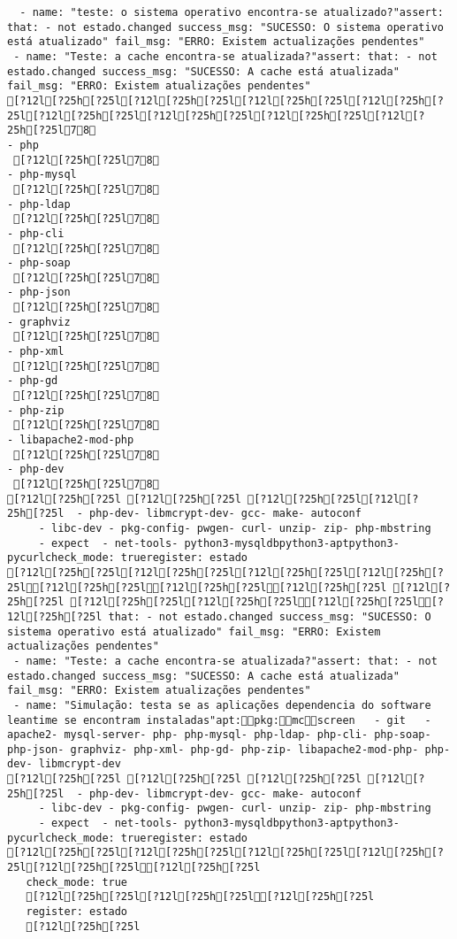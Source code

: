 \documentclass{scrartcl}
\begin{document}
\begin{Verbatim}
  - name: "teste: o sistema operativo encontra-se atualizado?"assert: that: - not estado.changed success_msg: "SUCESSO: O sistema operativo está atualizado" fail_msg: "ERRO: Existem actualizações pendentes"
 - name: "Teste: a cache encontra-se atualizada?"assert: that: - not estado.changed success_msg: "SUCESSO: A cache está atualizada" fail_msg: "ERRO: Existem atualizações pendentes"
[?12l[?25h[?25l[?12l[?25h[?25l[?12l[?25h[?25l[?12l[?25h[?25l[?12l[?25h[?25l[?12l[?25h[?25l[?12l[?25h[?25l[?12l[?25h[?25l78
- php
 [?12l[?25h[?25l78
- php-mysql
 [?12l[?25h[?25l78
- php-ldap
 [?12l[?25h[?25l78
- php-cli
 [?12l[?25h[?25l78
- php-soap
 [?12l[?25h[?25l78
- php-json
 [?12l[?25h[?25l78
- graphviz
 [?12l[?25h[?25l78
- php-xml
 [?12l[?25h[?25l78
- php-gd
 [?12l[?25h[?25l78
- php-zip
 [?12l[?25h[?25l78
- libapache2-mod-php
 [?12l[?25h[?25l78
- php-dev
 [?12l[?25h[?25l78
[?12l[?25h[?25l [?12l[?25h[?25l [?12l[?25h[?25l[?12l[?25h[?25l  - php-dev- libmcrypt-dev- gcc- make- autoconf
     - libc-dev - pkg-config- pwgen- curl- unzip- zip- php-mbstring
     - expect  - net-tools- python3-mysqldbpython3-aptpython3-pycurlcheck_mode: trueregister: estado
[?12l[?25h[?25l[?12l[?25h[?25l[?12l[?25h[?25l[?12l[?25h[?25l[?12l[?25h[?25l[?12l[?25h[?25l[?12l[?25h[?25l [?12l[?25h[?25l [?12l[?25h[?25l[?12l[?25h[?25l[?12l[?25h[?25l[?12l[?25h[?25l that: - not estado.changed success_msg: "SUCESSO: O sistema operativo está atualizado" fail_msg: "ERRO: Existem actualizações pendentes"
 - name: "Teste: a cache encontra-se atualizada?"assert: that: - not estado.changed success_msg: "SUCESSO: A cache está atualizada" fail_msg: "ERRO: Existem atualizações pendentes"
 - name: "Simulação: testa se as aplicações dependencia do software leantime se encontram instaladas"apt:pkg:mcscreen   - git   - apache2- mysql-server- php- php-mysql- php-ldap- php-cli- php-soap- php-json- graphviz- php-xml- php-gd- php-zip- libapache2-mod-php- php-dev- libmcrypt-dev
[?12l[?25h[?25l [?12l[?25h[?25l [?12l[?25h[?25l [?12l[?25h[?25l  - php-dev- libmcrypt-dev- gcc- make- autoconf
     - libc-dev - pkg-config- pwgen- curl- unzip- zip- php-mbstring
     - expect  - net-tools- python3-mysqldbpython3-aptpython3-pycurlcheck_mode: trueregister: estado
[?12l[?25h[?25l[?12l[?25h[?25l[?12l[?25h[?25l[?12l[?25h[?25l[?12l[?25h[?25l[?12l[?25h[?25l
   check_mode: true
   [?12l[?25h[?25l[?12l[?25h[?25l[?12l[?25h[?25l
   register: estado
   [?12l[?25h[?25l

\end{Verbatim}
\end{document}
